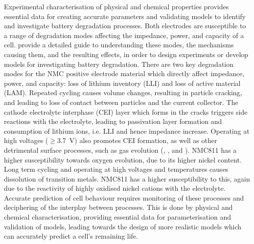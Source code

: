 \documentclass[journal=jacsat,manuscript=article]{achemso}
\begin{document}
Experimental characterisation of physical and chemical properties provides essential data for creating accurate parameters and validating models to identify and investigate battery degradation processes. 
Both electrodes are susceptible to a range of degradation modes affecting the impedance, power, and capacity of a cell. 
\citeauthor{Edge2021Degradation} provide a detailed guide to understanding these modes, the mechanisms causing them, and the resulting effects, in order to design experiments or develop models for investigating battery degradation.\cite{Edge2021Degradation} 
There are two key degradation modes for the NMC positive electrode material which directly affect impedance, power, and capacity: loss of lithium inventory (LLI) and loss of active material (LAM).\cite{erickson2017recent,erickson2017recent}
Repeated cycling causes volume changes, resulting in particle cracking,\cite{Woodford2010} and leading to loss of contact between particles and the current collector.\cite{erickson2017recent} 
The cathode electrolyte interphase (CEI) layer which forms in the cracks triggers side reactions with the electrolyte, leading to passivation layer formation and consumption of lithium ions, i.e. LLI and hence impedance increase.\cite{erickson2017recent}
Operating at high voltages ($\geq$3.7~V) also promotes CEI formation, as well as other detrimental surface processes, such as gas evolution (, , and ).\cite{jung2017chemical} 
NMC811 has a higher susceptibility towards oxygen evolution, due to its higher nickel content.\cite{Phillip2020} 
Long term cycling and operating at high voltages and temperatures causes dissolution of transition metals.\cite{li2018temperature} 
NMC811 has a higher susceptibility to this, again due to the reactivity of highly oxidised nickel cations with the electrolyte.\cite{billy2018dissolution} 
Accurate prediction of cell behaviour requires monitoring of these processes and deciphering of the interplay between processes.
This is done by physical and chemical characterisation, providing essential data for parameterisation and validation of models, leading towards the design of more realistic models which can accurately predict a cell's remaining life.
\end{document}
